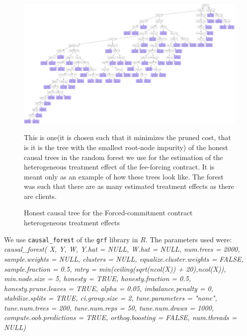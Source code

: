 \begin{figure}[H]
        \caption{Honest causal tree for the Forced-commitment contract heterogeneous treatment effects}
    \label{causal_tree1}
    \begin{center}
        \centering
        \includegraphics[width=\textwidth]{Figuras/crf_pro_2_apr.pdf}
    \end{center}
    \footnotesize 
    This is one(it is chosen such that it minimizes the pruned cost, that is it is the tree with the smallest root-node impurity) of the honest causal trees in the random forest we use for the estimation of the heterogeneous treatment effect of the fee-forcing contract. It is meant only as an example of how these trees look like. The forest was such that there are as many estimated treatment effects as there are clients.
\end{figure}

We use \cite{atheygrf} \texttt{causal\_forest} of the \texttt{grf} library in $R$. The parameters used were:
\scriptsize{\textit{causal\_forest(
  X, 
  Y, 
  W, 
  Y.hat = NULL, 
  W.hat = NULL, 
  num.trees = 2000, 
  sample.weights = NULL, 
  clusters = NULL, 
  equalize.cluster.weights = FALSE, 
  sample.fraction = 0.5, 
  mtry = min(ceiling(sqrt(ncol(X)) + 20),ncol(X)), 
  min.node.size = 5, 
  honesty = TRUE, 
  honesty.fraction = 0.5, 
  honesty.prune.leaves = TRUE, 
  alpha = 0.05, 
  imbalance.penalty = 0, 
  stabilize.splits = TRUE, 
  ci.group.size = 2, 
  tune.parameters = "none", 
  tune.num.trees = 200, 
  tune.num.reps = 50, 
  tune.num.draws = 1000, 
  compute.oob.predictions = TRUE, 
  orthog.boosting = FALSE, 
  num.threads = NULL)}}


